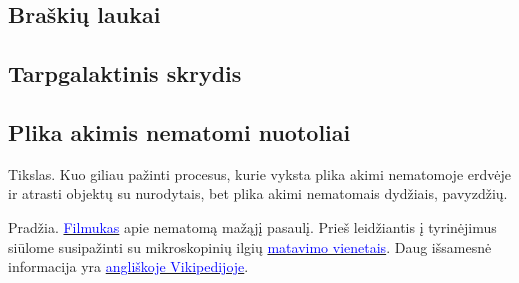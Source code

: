 \documentclass[a4paper]{article}
\begin{document}
\subsection{Braškių laukai}
\subsection{Tarpgalaktinis skrydis}
\subsection{Plika akimis nematomi nuotoliai}
Tikslas. Kuo giliau pažinti procesus, kurie vyksta plika akimi nematomoje erdvėje ir atrasti objektų su nurodytais, bet plika akimi nematomais dydžiais, pavyzdžių.

Pradžia. \href{https://www.youtube.com/watch?v=7WhRJV\_bAiE}{\textcolor{blue}{Filmukas}} apie nematomą mažąjį pasaulį. Prieš leidžiantis į tyrinėjimus siūlome susipažinti su mikroskopinių ilgių \href{https://lt.wikipedia.org/wiki/Matavimo_vienetas#Ilgio_matavimo_vienetai}{\textcolor{blue}{matavimo vienetais}}. Daug išsamesnė informacija yra \href{https://en.wikipedia.org/wiki/Orders\_of\_magnitude\_(length)}{\textcolor{blue}{angliškoje Vikipedijoje}}.
\end{document}
